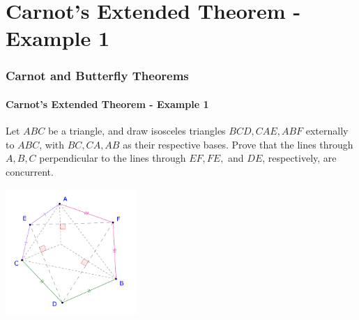 \documentclass[8pt,xcolor=table,dvipsnames]{beamer}
\begin{document}
\section{Carnot's Extended Theorem - Example 1}

\begin{frame}[t]
    \frametitle{Carnot and Butterfly Theorems}
    \framesubtitle{Carnot's Extended Theorem - Example 1}
    \begin{example}
        Let $ABC$ be a triangle, and draw isosceles triangles $BCD, CAE, ABF$ externally to $ABC$,
        with $BC, CA, AB$ as their respective bases.
        Prove that the lines through $A,B,C$ perpendicular to the lines through $EF, FE,$ and $DE$, respectively, are concurrent.
    \end{example}

    \bigbreak
    \begin{center}
        \includegraphics[width=5cm]{./svg/pdf/24-25-s7-g3-p3-0.pdf}
    \end{center}  
\end{frame}
\end{document}
